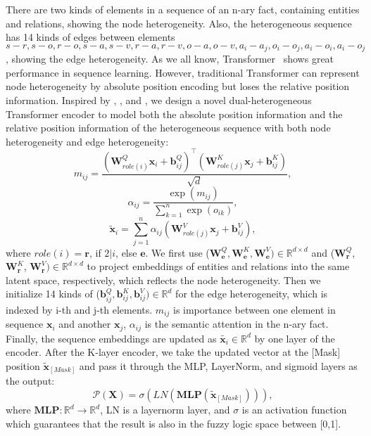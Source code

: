 \documentclass[letterpaper]{article} \usepackage{aaai23}  \usepackage{times}  \usepackage{helvet}  \usepackage{courier}  \usepackage[hyphens]{url}  \usepackage{graphicx} \urlstyle{rm} \def\UrlFont{\rm}  \usepackage{natbib}  \usepackage{caption} \frenchspacing  \setlength{\pdfpagewidth}{8.5in}  \setlength{\pdfpageheight}{11in}  \usepackage{algorithm}
\begin{document}
There are two kinds of elements in a sequence of an n-ary fact, containing entities and relations, showing the node heterogeneity. Also, the heterogeneous sequence has 14 kinds of edges between elements $s-r, s-o, r-o, s-a, s-v, r-a, r-v, o-a, o-v, a_i-a_j, o_i -o_j, a_i-o_i, a_i-o_j$, showing the edge heterogeneity. As we all know, Transformer~\citep{Transformer} shows great performance in sequence learning. However, traditional Transformer can represent node heterogeneity by absolute position encoding but loses the relative position information. Inspired by \citep{HAN}, \citep{RPRT}, and \citep{GRAN}, we design a novel dual-heterogeneous Transformer encoder to model both the absolute position information and the relative position information of the heterogeneous sequence with both node heterogeneity and edge heterogeneity:
\begin{equation}
m_{i j}=\frac{\left(\mathbf{W}_{role(i)}^{Q} \boldsymbol{x}_{i}+\mathbf{b}_{i j}^{Q}\right)^{\top}\left(\mathbf{W}_{role(j)}^{K} \boldsymbol{x}_{j}+\mathbf{b}_{i j}^{K}\right)}{\sqrt{d}},
\end{equation}
\begin{equation}
\alpha_{i j}=\frac{\exp \left(m_{i j}\right)}{\sum_{k=1}^{n} \exp \left(o_{i k}\right)},
\end{equation}
\begin{equation}
\tilde{\boldsymbol{x}}_{i}=\sum_{j=1}^{n} \alpha_{i j}\left(\mathbf{W}_{role(j)}^{V} \boldsymbol{x}_{j}+\mathbf{b}_{i j}^{V}\right),
\end{equation}
where $role(i)=\mathbf{r}$, if $2|i$, else $\mathbf{e}$. We first use ($\mathbf{W}_{\mathbf{e}}^{Q}, \mathbf{W}_{\mathbf{e}}^{K}, \mathbf{W}_{\mathbf{e}}^{V}) \in \mathbb{R}^{d \times d}$ and ($\mathbf{W}_{\mathbf{r}}^{Q}$, $\mathbf{W}_{\mathbf{r}}^{K}$, $\mathbf{W}_{\mathbf{r}}^{V})\in \mathbb{R}^{d \times d}$ to project embeddings of entities and relations into the same latent space, respectively, which reflects the node heterogeneity. Then we initialize 14 kinds of ($\mathbf{b}_{i j}^{Q},  \mathbf{b}_{i j}^{K}, \mathbf{b}_{i j}^{V}) \in \mathbb{R}^{d}$ for the edge heterogeneity, which is indexed by i-th and j-th elements. $m_{i j}$ is importance between one element in sequence $\boldsymbol{x}_i$ and another $\boldsymbol{x}_j$, $\alpha_{i j}$ is the semantic attention in the n-ary fact. Finally, the sequence embeddings are updated as $\tilde{\boldsymbol{x}_{i}} \in \mathbb{R}^{d}$ by one layer of the encoder. After the K-layer encoder, we take the updated vector at the [Mask] position $\tilde{\boldsymbol{x}}_{[Mask]}$ and pass it through the MLP, LayerNorm, and sigmoid layers as the output:
\begin{equation}
\mathcal{P}(\boldsymbol{X})=\sigma(LN(\mathbf{MLP}(\tilde{\boldsymbol{x}}_{[Mask]}))),
\end{equation}
where $\mathbf{MLP}:\mathbb{R}^{d}\rightarrow\mathbb{R}^{d}$, LN is a layernorm layer, and $\sigma$ is an activation function which guarantees that the result is also in the fuzzy logic space between [0,1].
\end{document}
